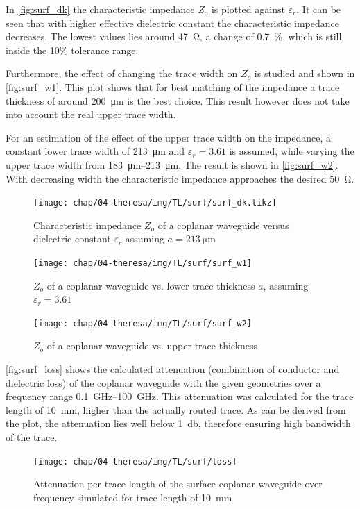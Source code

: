 In \autoref{fig:surf_dk} the characteristic impedance $Z_o$ is plotted against $\varepsilon_r$.
It can be seen that with higher effective dielectric constant the characteristic impedance decreases.
The lowest values lies around \SI{47}{\ohm}, a change of \SI{0.7}{\percent}, which is still inside the 10\% tolerance range.

Furthermore, the effect of changing the trace width on $Z_o$ is studied and shown in \autoref{fig:surf_w1}.
This plot shows that for best matching of the impedance a trace thickness of around \SI{200}{\micro \meter} is the best choice.
This result however does not take into account the real upper trace width.

For an estimation of the effect of the upper trace width on the impedance, a constant lower trace width of \SI{213}{\micro \meter} and $\varepsilon_r = 3.61$ is assumed, while varying the upper trace width from \SIrange{183}{213}{\micro \meter}.
The result is shown in \autoref{fig:surf_w2}.
With decreasing width the characteristic impedance approaches the desired \SI{50}{\ohm}.

\begin{figure}[tb]
	\centering
	\texttt{[image: chap/04-theresa/img/TL/surf/surf\_dk.tikz]}
	\caption[CWG, $Z_o$ vs $\varepsilon_r$]{Characteristic impedance $Z_o$ of a coplanar waveguide versus dielectric constant $\varepsilon_r$ assuming $a = \SI{213}{\micro \meter}$}
	\label{fig:surf_dk}
\end{figure}

\begin{figure}[tb]
	\centering
	\texttt{[image: chap/04-theresa/img/TL/surf/surf\_w1]}
	\caption[CWG, $Z_o$ vs. $a$]{$Z_o$ of a coplanar waveguide vs. lower trace thickness $a$, assuming $\varepsilon_r = 3.61$}
	\label{fig:surf_w1}
\end{figure}

\begin{figure}[tb]
	\centering
	\texttt{[image: chap/04-theresa/img/TL/surf/surf\_w2]}
	\caption[CWG, $Z_o$ vs. upper trace width]{$Z_o$ of a coplanar waveguide vs. upper trace thickness}
	\label{fig:surf_w2}
\end{figure}

\autoref{fig:surf_loss} shows the calculated attenuation (combination of conductor and dielectric loss) of the coplanar waveguide with the given geometries over a frequency range \SIrange{0.1}{100}{\GHz}. 
This attenuation was calculated for the trace length of \SI{10}{\mm}, higher than the actually routed trace.
As can be derived from the plot, the attenuation lies well below \SI{1}{\decibel}, therefore ensuring high bandwidth of the trace.
\begin{figure}[tb]
	\centering
	\texttt{[image: chap/04-theresa/img/TL/surf/loss]}
	\caption[Attenuation CPWG for \SI{10}{\mm}]{Attenuation per trace length of the surface coplanar waveguide over frequency simulated for trace length of \SI{10}{\mm}}
	\label{fig:surf_loss}
\end{figure}

